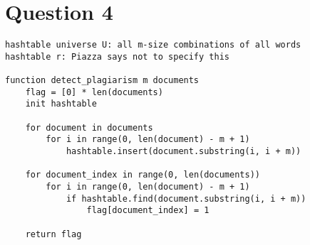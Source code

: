 \documentclass[11pt, oneside]{article}
\begin{document}
\clearpage

\section{Question 4}

\begin{lstlisting}
hashtable universe U: all m-size combinations of all words
hashtable r: Piazza says not to specify this

function detect_plagiarism m documents
    flag = [0] * len(documents)
    init hashtable 

    for document in documents
        for i in range(0, len(document) - m + 1)
            hashtable.insert(document.substring(i, i + m))

    for document_index in range(0, len(documents))
        for i in range(0, len(document) - m + 1)
            if hashtable.find(document.substring(i, i + m))
                flag[document_index] = 1

    return flag
\end{lstlisting}

\clearpage
\end{document}
